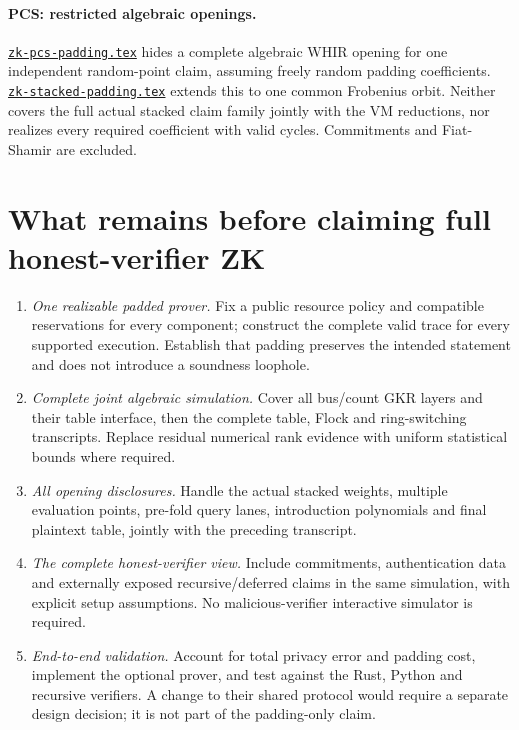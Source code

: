 \documentclass[11pt]{article}
\theoremstyle{definition}
\newcommand{\researchnote}[1]{\href{../#1.tex}{\nolinkurl{#1.tex}}}
\begin{document}
\paragraph{PCS: restricted algebraic openings.} \researchnote{zk-pcs-padding} hides a complete algebraic WHIR opening for one independent random-point claim, assuming freely random padding coefficients. \researchnote{zk-stacked-padding} extends this to one common Frobenius orbit. Neither covers the full actual stacked claim family jointly with the VM reductions, nor realizes every required coefficient with valid cycles. Commitments and Fiat-Shamir are excluded.

\section{What remains before claiming full honest-verifier ZK}\label{sec:zk-remaining}

\begin{enumerate}
\item \emph{One realizable padded prover.} Fix a public resource policy and compatible reservations for every component; construct the complete valid trace for every supported execution. Establish that padding preserves the intended statement and does not introduce a soundness loophole.
\item \emph{Complete joint algebraic simulation.} Cover all bus/count GKR layers and their table interface, then the complete table, Flock and ring-switching transcripts. Replace residual numerical rank evidence with uniform statistical bounds where required.
\item \emph{All opening disclosures.} Handle the actual stacked weights, multiple evaluation points, pre-fold query lanes, introduction polynomials and final plaintext table, jointly with the preceding transcript.
\item \emph{The complete honest-verifier view.} Include commitments, authentication data and externally exposed recursive/deferred claims in the same simulation, with explicit setup assumptions. No malicious-verifier interactive simulator is required.
\item \emph{End-to-end validation.} Account for total privacy error and padding cost, implement the optional prover, and test against the Rust, Python and recursive verifiers. A change to their shared protocol would require a separate design decision; it is not part of the padding-only claim.
\end{enumerate}
\end{document}
